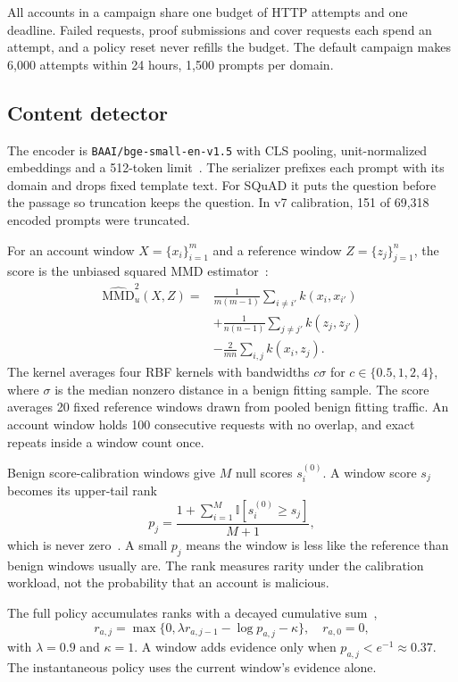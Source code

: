 \documentclass[journal]{IEEEtran}
\newcommand{\I}{\mathbb{I}}
\begin{document}
All accounts in a campaign share one budget of HTTP attempts and one deadline. Failed requests, proof submissions and cover requests each spend an attempt, and a policy reset never refills the budget. The default campaign makes 6,000 attempts within 24 hours, 1,500 prompts per domain.

\subsection{Content detector}
\label{sec:score}
The encoder is \texttt{BAAI/bge-small-en-v1.5} with CLS pooling, unit-normalized embeddings and a 512-token limit~\cite{xiao2024cpack,bge2023model}. The serializer prefixes each prompt with its domain and drops fixed template text. For SQuAD it puts the question before the passage so truncation keeps the question. In v7 calibration, 151 of 69,318 encoded prompts were truncated.

For an account window $X=\{x_i\}_{i=1}^{m}$ and a reference window $Z=\{z_j\}_{j=1}^{n}$, the score is the unbiased squared MMD estimator~\cite{gretton2012kernel}:
\begin{align}
\widehat{\mathrm{MMD}}_u^2(X,Z)
={}&\frac{1}{m(m-1)}\sum_{i\ne i'}k(x_i,x_{i'})\nonumber\\
	&+\frac{1}{n(n-1)}\sum_{j\ne j'}k(z_j,z_{j'})\nonumber\\
	&-\frac{2}{mn}\sum_{i,j}k(x_i,z_j).
\label{eq:mmd}
\end{align}
The kernel averages four RBF kernels with bandwidths $c\sigma$ for $c\in\{0.5,1,2,4\}$, where $\sigma$ is the median nonzero distance in a benign fitting sample. The score averages 20 fixed reference windows drawn from pooled benign fitting traffic. An account window holds 100 consecutive requests with no overlap, and exact repeats inside a window count once.

Benign score-calibration windows give $M$ null scores $s_i^{(0)}$. A window score $s_j$ becomes its upper-tail rank
\begin{equation}
p_j=\frac{1+\sum_{i=1}^{M}\I[s_i^{(0)}\geq s_j]}{M+1},
\end{equation}
which is never zero~\cite{phipson2010permutation}. A small $p_j$ means the window is less like the reference than benign windows usually are. The rank measures rarity under the calibration workload, not the probability that an account is malicious.

The full policy accumulates ranks with a decayed cumulative sum~\cite{page1954cusum},
\begin{equation}
r_{a,j}=\max\{0,\lambda r_{a,j-1}-\log p_{a,j}-\kappa\},
\quad r_{a,0}=0,
\label{eq:risk}
\end{equation}
with $\lambda=0.9$ and $\kappa=1$. A window adds evidence only when $p_{a,j}<e^{-1}\approx0.37$. The instantaneous policy uses the current window's evidence alone.
\end{document}
